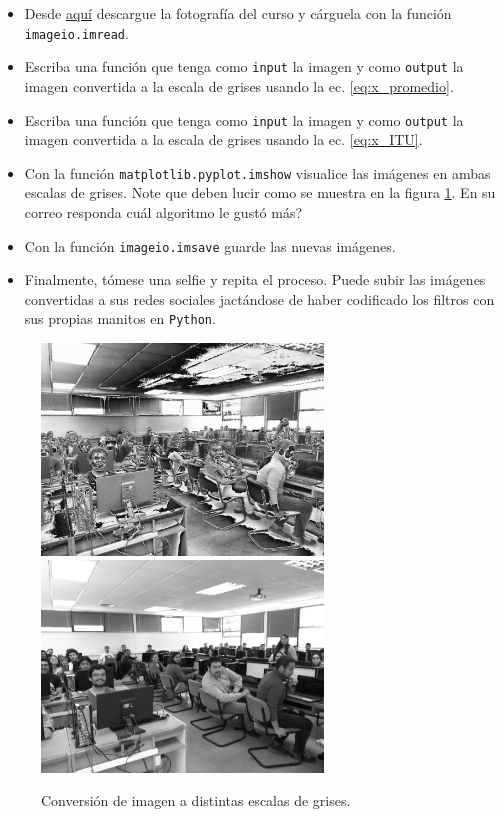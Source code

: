 \documentclass[11pt]{exam}
\newcommand{\figref}[1]{\ref{#1}}
\begin{document}
\begin{itemize}
\item Desde \href{https://github.com/PythonUdeC/CPC19/blob/master/images/IMG_20190109_144618.jpg}{aqu\'i} descargue la fotograf\'ia del curso y c\'arguela con la funci\'on \texttt{imageio.imread}.
\item Escriba una funci\'on que tenga como \texttt{input} la imagen y como \texttt{output} la imagen convertida a la escala de grises usando la ec. \eqref{eq:x_promedio}.
\item Escriba una funci\'on que tenga como \texttt{input} la imagen y como \texttt{output} la imagen convertida a la escala de grises usando la ec. \eqref{eq:x_ITU}.
\item Con la funci\'on \texttt{matplotlib.pyplot.imshow} visualice las im\'agenes en ambas escalas de grises. Note que deben lucir como se muestra en la figura \figref{fig:escalas_grises}. En su correo responda \textquestiondown cu\'al algoritmo le gust\'o m\'as?
\item Con la funci\'on \texttt{imageio.imsave} guarde las nuevas im\'agenes.
\item Finalmente, t\'omese una selfie y repita el proceso. Puede subir las im\'agenes convertidas a sus redes sociales jact\'andose de haber codificado los filtros con sus propias manitos en \texttt{Python}.
\end{itemize}
\begin{figure}[H]
 \centering
 \includegraphics[width=7.5cm]{../images/curso_gris01.jpg}
 \includegraphics[width=7.5cm]{../images/curso_gris02.jpg}
 \caption{Conversi\'on de imagen a distintas escalas de grises.}
 \label{fig:escalas_grises}
\end{figure} 
\end{document}

